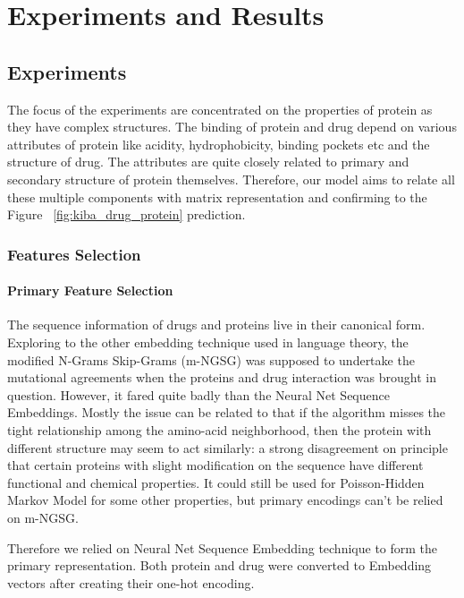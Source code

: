 \chapter{Experiments and Results}


\section{Experiments}

\iffalse
SVM-Regression
Random-Forest Regression
Deep Learning Network

Neural Net Sequence Embeddings
One-Hot Encodings
Modfied n-grams skip-grams
\fi

The focus of the experiments are concentrated on the properties of protein as they have complex structures. The binding of protein and drug depend on various attributes of protein like acidity, hydrophobicity, binding pockets etc and the structure of drug. The attributes are quite closely related to primary and secondary structure of protein themselves. Therefore, our model aims to relate all these multiple components with matrix representation and confirming to the Figure ~\ref{fig:kiba_drug_protein} prediction.

\subsection{Features Selection}
\subsubsection{Primary Feature Selection}
The sequence information of drugs and proteins live in their canonical form. Exploring to the other embedding technique used in language theory, the modified N-Grams Skip-Grams (m-NGSG) was supposed to undertake the mutational agreements when the proteins and drug interaction was brought in question. However, it fared quite badly than the Neural Net Sequence Embeddings. Mostly the issue can be related to that if the algorithm misses the tight relationship among the amino-acid neighborhood, then the protein with different structure may seem to act similarly: a strong disagreement on principle that certain proteins with slight modification on the sequence have different functional and chemical properties. It could still be used for Poisson-Hidden Markov Model for some other properties, but primary encodings can't be relied on m-NGSG. 

Therefore we relied on Neural Net Sequence Embedding technique to form the primary representation. Both protein and drug were converted to Embedding vectors after creating their one-hot encoding.

